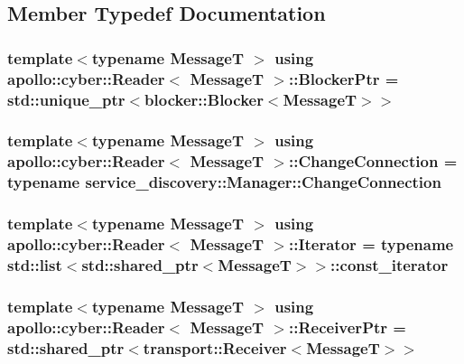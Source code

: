 \subsection{Member Typedef Documentation}
\hypertarget{classapollo_1_1cyber_1_1Reader_a44a6c385712936a5d4eaaa1920d05013}{
\subsubsection[{Blocker\-Ptr}]{\setlength{\rightskip}{0pt plus 5cm}template$<$typename Message\-T $>$ using {\bf apollo\-::cyber\-::\-Reader}$<$ Message\-T $>$\-::{\bf Blocker\-Ptr} =  std\-::unique\-\_\-ptr$<${\bf blocker\-::\-Blocker}$<$Message\-T$>$$>$}}\label{classapollo_1_1cyber_1_1Reader_a44a6c385712936a5d4eaaa1920d05013}
\hypertarget{classapollo_1_1cyber_1_1Reader_a1bb84e1881d6df00cd3b8fc669b606b4}{
\subsubsection[{Change\-Connection}]{\setlength{\rightskip}{0pt plus 5cm}template$<$typename Message\-T $>$ using {\bf apollo\-::cyber\-::\-Reader}$<$ Message\-T $>$\-::{\bf Change\-Connection} =  typename {\bf service\-\_\-discovery\-::\-Manager\-::\-Change\-Connection}}}\label{classapollo_1_1cyber_1_1Reader_a1bb84e1881d6df00cd3b8fc669b606b4}
\hypertarget{classapollo_1_1cyber_1_1Reader_a54b26f524fb24d2b90fc9fb6fa908bf3}{
\subsubsection[{Iterator}]{\setlength{\rightskip}{0pt plus 5cm}template$<$typename Message\-T $>$ using {\bf apollo\-::cyber\-::\-Reader}$<$ Message\-T $>$\-::{\bf Iterator} =  typename std\-::list$<$std\-::shared\-\_\-ptr$<$Message\-T$>$$>$\-::const\-\_\-iterator}}\label{classapollo_1_1cyber_1_1Reader_a54b26f524fb24d2b90fc9fb6fa908bf3}
\hypertarget{classapollo_1_1cyber_1_1Reader_a7c76533ce5c8e13f5382248ae2059aad}{
\subsubsection[{Receiver\-Ptr}]{\setlength{\rightskip}{0pt plus 5cm}template$<$typename Message\-T $>$ using {\bf apollo\-::cyber\-::\-Reader}$<$ Message\-T $>$\-::{\bf Receiver\-Ptr} =  std\-::shared\-\_\-ptr$<${\bf transport\-::\-Receiver}$<$Message\-T$>$$>$}}\label{classapollo_1_1cyber_1_1Reader_a7c76533ce5c8e13f5382248ae2059aad}


